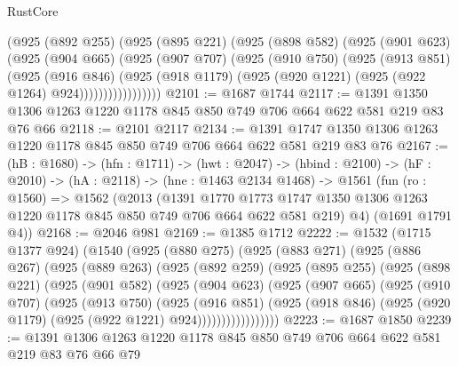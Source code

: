 \begin{lexlean}{RustCore}
\begin{coremodule}
              (@925
                (@892 @255)
                (@925
                  (@895 @221)
                  (@925
                    (@898 @582)
                    (@925
                      (@901 @623)
                      (@925
                        (@904 @665)
                        (@925
                          (@907 @707)
                          (@925
                            (@910 @750)
                            (@925
                              (@913 @851)
                              (@925
                                (@916 @846)
                                (@925
                                  (@918 @1179)
                                  (@925 (@920 @1221) (@925 (@922 @1264) @924)))))))))))))))))
@2101 := @1687 @1744
@2117 := @1391 @1350 @1306 @1263 @1220 @1178 @845 @850 @749 @706 @664 @622 @581 @219 @83 @76 @66
@2118 := @2101 @2117
@2134 := @1391 @1747 @1350 @1306 @1263 @1220 @1178 @845 @850 @749 @706 @664 @622 @581 @219 @83 @76
@2167 := (hB : @1680) ->
  (hfn : @1711) ->
  (hwt : @2047) ->
  (hbind : @2100) ->
  (hF : @2010) ->
  (hA : @2118) ->
  (hne : @1463 @2134 @1468) ->
  @1561
    (fun (ro : @1560) =>
    @1562
      (@2013
        (@1391
          @1770
          @1773
          @1747
          @1350
          @1306
          @1263
          @1220
          @1178
          @845
          @850
          @749
          @706
          @664
          @622
          @581
          @219)
        @4)
      (@1691 @1791 @4))
@2168 := @2046 @981
@2169 := @1385 @1712
@2222 := @1532
    (@1715 @1377 @924)
    (@1540
      (@925
        (@880 @275)
        (@925
          (@883 @271)
          (@925
            (@886 @267)
            (@925
              (@889 @263)
              (@925
                (@892 @259)
                (@925
                  (@895 @255)
                  (@925
                    (@898 @221)
                    (@925
                      (@901 @582)
                      (@925
                        (@904 @623)
                        (@925
                          (@907 @665)
                          (@925
                            (@910 @707)
                            (@925
                              (@913 @750)
                              (@925
                                (@916 @851)
                                (@925
                                  (@918 @846)
                                  (@925 (@920 @1179) (@925 (@922 @1221) @924)))))))))))))))))
@2223 := @1687 @1850
@2239 := @1391 @1306 @1263 @1220 @1178 @845 @850 @749 @706 @664 @622 @581 @219 @83 @76 @66 @79

\end{coremodule}
\end{lexlean}
